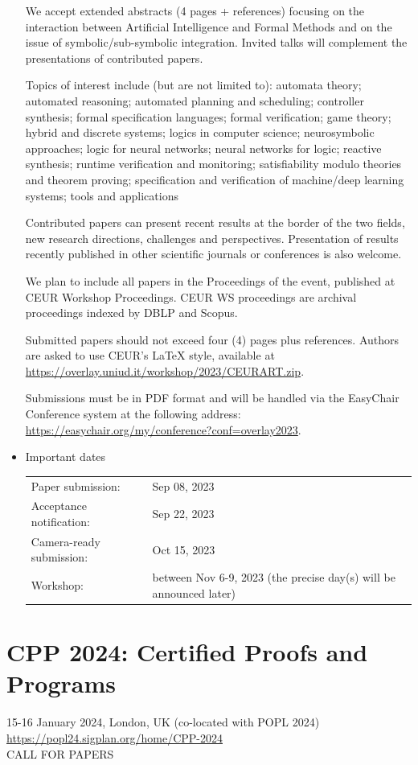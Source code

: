 \documentclass[prodmode,acmtecs]{acmsmall} %
\begin{document}
\begin{itemize}
  We accept extended abstracts (4 pages + references) focusing on the interaction between Artificial Intelligence and Formal Methods and on the issue of symbolic/sub-symbolic integration. Invited talks will complement the presentations of contributed papers. 
 
  Topics of interest include (but are not limited to): automata theory; automated reasoning; automated planning and scheduling; controller synthesis; formal specification languages; formal verification; game theory; hybrid and discrete systems; logics in computer science; neurosymbolic approaches; logic for neural networks; neural networks for logic; reactive synthesis; runtime verification and monitoring; satisfiability modulo theories and theorem proving; specification and verification of machine/deep learning systems; tools and applications 
 
  Contributed papers can present recent results at the border of the two fields, new research directions, challenges and perspectives. Presentation of results recently published in other scientific journals or conferences is also welcome. 
 
  We plan to include all papers in the Proceedings of the event, published at CEUR Workshop Proceedings. CEUR WS proceedings are archival proceedings indexed by DBLP and Scopus. 
 
  Submitted papers should not exceed four (4) pages plus references. Authors are asked to use CEUR's LaTeX style, available at \href{https://overlay.uniud.it/workshop/2023/CEURART.zip}{https://overlay.uniud.it/workshop/2023/CEURART.zip}.  
 
  Submissions must be in PDF format and will be handled via the EasyChair Conference system at the following address: \href{https://easychair.org/my/conference?conf=overlay2023}{https://easychair.org/my/conference?conf=overlay2023}. 
 
\item  Important dates 
 
\begin{tabulary}{\linewidth}{LL}Paper submission:  & Sep 08, 2023 \\
Acceptance notification:  & Sep 22, 2023 \\
Camera-ready submission:  & Oct 15, 2023 \\
Workshop:  & between Nov 6-9, 2023 (the precise day(s) will be announced later) \\
\end{tabulary}
 
\end{itemize}\section{CPP 2024: Certified Proofs and Programs}\label{CPP2024}  15-16 January 2024, London, UK (co-located with POPL 2024)\\ 
  \href{https://popl24.sigplan.org/home/CPP-2024}{https://popl24.sigplan.org/home/CPP-2024}\\ 
CALL FOR PAPERS 
\end{document}

